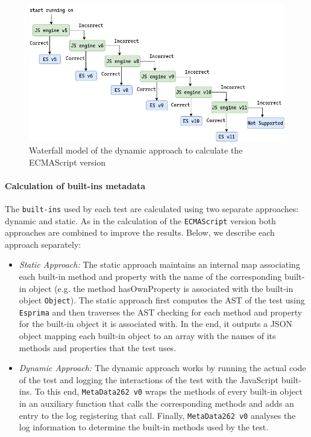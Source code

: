 \documentclass[runningheads]{llncs}
\begin{document}
\begin{figure}[ht]
    \centering
    \includegraphics[width=1\textwidth]{images/waterfall_model.png}
    \caption{Waterfall model of the dynamic approach to calculate the ECMAScript version}
    \label{fig:waterfall_model}
\end{figure}



\paragraph{Calculation of built-ins metadata}
The \texttt{built-ins} used by each test are calculated using two separate approaches: dynamic and static. As in the calculation of the \texttt{ECMAScript} version both approaches are combined to improve the results. Below, we describe each approach separately:

\begin{itemize}
  \item \emph{Static Approach:}
The static approach maintains an internal map associating each built-in method and property with the name of the corresponding  built-in object (e.g. the method hasOwnProperty is associated with the built-in object \texttt{Object}). The static approach first computes the AST of the test using \texttt{Esprima} and then traverses the AST checking for each method and property for the built-in object it is associated with. In the end, it outputs a JSON object mapping each built-in object to an array with the names of its methods and properties that the test uses. 
%
  \item \emph{Dynamic Approach:}
The dynamic approach works by running the actual code of the test and logging the interactions of the test with the JavaScript built-ins. To this end, \texttt{MetaData262 v0} wraps the methods of every built-in object in an auxiliary function that calls the corresponding methods and adds an entry to the log registering that call. Finally, \texttt{MetaData262 v0} analyses the log information to determine the built-in methods used by the test. 
\end{itemize}
\end{document}
